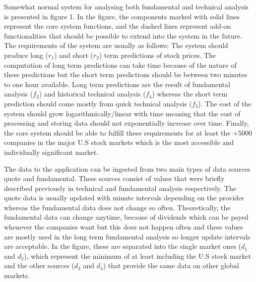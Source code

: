 
Somewhat normal system for analysing both fundamental and technical analysis is presented in figure 1.
In the figure, the components marked with solid lines represent the core system functions, and the dashed lines represent add-on functionalities that should be possible to extend into the system in the future.
The requirements of the system are usually as follows;
The system should produce long ($r_1$) and short ($r_2$) term predictions of stock prices.
The computation of long term predictions can take time because of the nature of these predictions but the short term predictions should be between two minutes to one hour available.
Long term predictions are the result of fundamental analysis ($f_2$) and historical technical analysis ($f_4$) whereas the short term prediction should come mostly from quick technical analysis ($f_3$).
The cost of the system should grow logarithmically/linear with time meaning that the cost of processing and storing data should not exponentially increase over time.
Finally, the core system should be able to fulfill these requirements for at least the +5000 companies in the major U.S stock markets which is the most accessible and individually significant market.

The data to the application can be ingested from two main types of data sources quote and fundamental.
These sources consist of values that were briefly described previously in technical and fundamental analysis respectively.
The quote data is usually updated with minute intervals depending on the provider whereas the fundamental data does not change so often.
Theoretically, the fundamental data can change anytime, because of dividends which can be payed whenever the companies want but this does not happen often and these values are mostly used in the long term fundamental analysis so longer update intervals are acceptable.
In the figure, these are separated into the single market ones ($d_1$ and $d_2$), which represent the minimum of at least including the U.S stock market and the other sources ($d_3$ and $d_4$) that provide the same data on other global markets.

